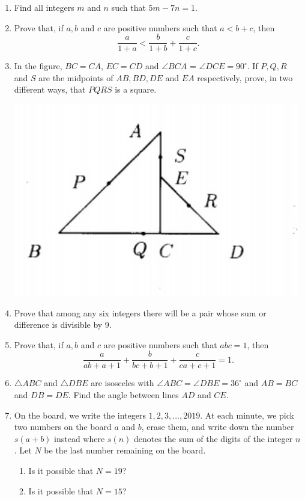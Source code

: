 \documentclass{article}
\begin{document}
\begin{enumerate}[1.]

\bigskip
\item %
Find all integers $m$ and $n$ such that $5m - 7n = 1$.


\bigskip
\item %
Prove that, if $a, b$ and $c$ are positive numbers such that $a < b + c$, then
\[ \frac{a}{1+a} < \frac{b}{1+b} + \frac{c}{1+c}. \]


\bigskip
\item
In the figure, $BC = CA$, $EC = CD$ and $\angle BCA$ = $\angle DCE = 90^{\circ}$.
If $P, Q, R$ and $S$ are the midpoints of $AB, BD, DE$ and $EA$ respectively, prove, in two different ways, that $PQRS$ is a square.
\begin{center}
	\includegraphics[scale=0.5]{int_q5.jpg}
\end{center}


\item %
Prove that among any six integers there will be a pair whose sum
or difference is divisible by 9.


\bigskip
\item %
Prove that, if $a, b$ and $c$ are positive numbers such that $abc= 1$, then
\[ \frac{a}{ab + a + 1} + \frac{b}{bc + b + 1} + \frac{c}{ca + c + 1} = 1. \]


\bigskip
\item 
$\triangle ABC$ and $\triangle DBE$ are isosceles with $\angle ABC = \angle DBE = 36^{\circ}$ and $AB = BC$ and $DB = DE$.
Find the angle between lines $AD$ and $CE$.


\bigskip
\item %
On the board, we write the integers $1, 2, 3, \dots, 2019$.
At each minute, we pick two numbers on the board $a$ and $b$, erase them, and write down the number $s(a + b)$ instead where $s(n)$ denotes the sum of the digits of the integer $n$.
Let $N$ be the last number remaining on the board.
\begin{enumerate}
	\item Is it possible that $N = 19$?
	\item Is it possible that $N = 15$?
\end{enumerate}



\end{enumerate}
\end{document}
